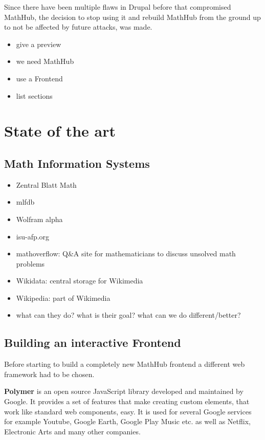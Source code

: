 \documentclass[11pt,a4paper]{article}
\begin{document}
Since there have been multiple flaws in Drupal before that compromised MathHub, the decision to stop using it and rebuild MathHub from the ground up to not be affected by future attacks, was made. 

\begin{itemize}
\item give a preview
\item we need MathHub
\item use a Frontend
\item list sections
\end{itemize}
\section{State of the art}
\subsection{Math Information Systems}
\begin{itemize}
\item Zentral Blatt Math
\item mlfdb
\item Wolfram alpha
\item isu-afp.org
\item mathoverflow: Q{\&}A site for mathematicians to discuss unsolved math problems
\item Wikidata: central storage for Wikimedia
\item Wikipedia: part of Wikimedia
\item what can they do? what is their goal? what can we do different/better?
\end{itemize}

\subsection{Building an interactive Frontend} 
Before starting to build a completely new MathHub frontend a different web framework had to be chosen.

\textbf{Polymer} \cite{polymer} is an open source JavaScript library developed and maintained by Google.
It provides a set of features that make creating custom elements, that work like standard web components, easy.
It is used for several Google services for example Youtube, Google Earth, Google Play Music etc. as well as Netflix, Electronic Arts and many other companies. 
\end{document}
